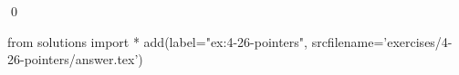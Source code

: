 
\begin{ex}
  \label{ex:4-26-pointers}
  
  \qed
\end{ex}
\begin{python0}
from solutions import *
add(label="ex:4-26-pointers",
    srcfilename='exercises/4-26-pointers/answer.tex')
\end{python0}
